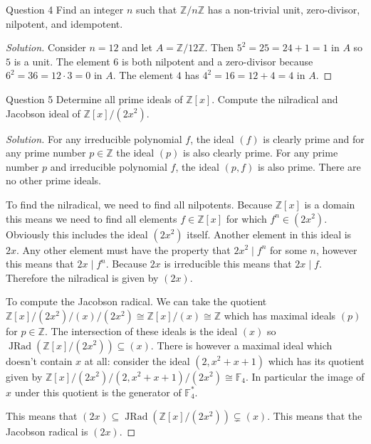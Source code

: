 \documentclass{article}
\newcommand{\Z}{\mathbb{Z}}
\newcommand{\F}{\mathbb{F}}
\DeclareMathOperator{\JRad}{JRad}
\newenvironment{question}[1][]{\begin{paragraph}{Question #1}}{\end{paragraph}}
\newenvironment{solution}{\begin{proof}[Solution]\renewcommand\qedsymbol{}}{\end{proof}}
\theoremstyle{definition}
\begin{document}
\begin{question}[4]
    Find an integer \(n\) such that \(\Z/n\Z\) has a non-trivial unit,
    zero-divisor, nilpotent, and idempotent.

    \begin{solution}
        Consider \(n=12\) and let \(A=\Z/12\Z\). Then \(5^{2}=25=24+1=1\) in
        \(A\) so \(5\) is a unit. The element \(6\) is both nilpotent and a
        zero-divisor because \(6^{2}=36=12\cdot3=0\) in \(A\). The element \(4\) has
        \(4^{2}=16=12+4=4\) in \(A\).
    \end{solution}
\end{question}

\begin{question}[5]
    Determine all prime ideals of \(\Z[x]\). Compute the nilradical and Jacobson
    ideal of \(\Z[x]/(2x^{2})\).

    \begin{solution}
        For any irreducible polynomial \(f\), the ideal \((f)\) is clearly prime
        and for any prime number \(p\in\Z\) the ideal \((p)\) is also clearly
        prime. For any prime number \(p\) and irreducible polynomial \(f\), the
        ideal \((p,f)\) is also prime. There are no other prime ideals.

        To find the nilradical, we need to find all nilpotents. Because
        \(\Z[x]\) is a domain this means we need to find all elements
        \(f\in\Z[x]\) for which \(f^{n}\in (2x^{2})\). Obviously this includes
        the ideal \((2x^{2})\) itself. Another element in this ideal is \(2x\).
        Any other element must have the property that \(2x^{2}\mid f^{n}\) for
        some \(n\), however this means that \(2x\mid f^{n}\). Because \(2x\) is
        irreducible this means that \(2x\mid f\). Therefore the nilradical is
        given by \((2x)\).

        To compute the Jacobson radical. We can take the quotient
        \(\Z[x]/(2x^{2})/(x)/(2x^{2})\cong \Z[x]/(x)\cong\Z\) which has maximal
        ideals \((p)\) for \(p\in\Z\). The intersection of these ideals is the
        ideal \((x)\) so \(\JRad(\Z[x]/(2x^{2}))\subseteq(x)\). There is however
        a maximal ideal which doesn't contain \(x\) at all: consider the ideal
        \((2,x^{2}+x+1)\) which has its quotient given by
        \(\Z[x]/(2x^{2})/(2,x^{2}+x+1)/(2x^{2})\cong\F_{4}\). In particular the
        image of \(x\) under this quotient is the generator of \(\F_{4}^{*}\).

        This means that \((2x)\subseteq\JRad(\Z[x]/(2x^{2}))\subsetneq (x)\).
        This means that the Jacobson radical is \((2x)\).
    \end{solution}
\end{question}
\end{document}

